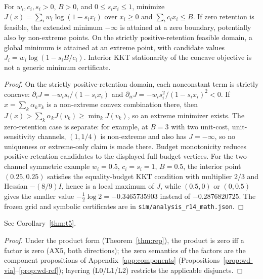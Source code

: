\begin{proposition}
\label{prop:linear-fraction}
For $w_i,c_i,s_i>0$, $B>0$, and $0\le s_ix_i\le1$, minimize
$J(x)=\sum_iw_i\log(1-s_ix_i)$ over $x_i\ge0$ and $\sum_i c_ix_i\le B$.
If zero retention is feasible, the extended minimum $-\infty$ is attained at
a zero boundary, potentially also by non-extreme points. On the strictly
positive-retention feasible domain, a global minimum is attained at an extreme
point, with candidate values $J_i=w_i\log(1-s_iB/c_i)$. Interior KKT
stationarity of the concave objective is not a generic minimum certificate.
\end{proposition}
\begin{proof}
On the strictly positive-retention domain, each nonconstant term is strictly
concave: $\partial_iJ=-w_is_i/(1-s_ix_i)$ and
$\partial_{ii}J=-w_is_i^2/(1-s_ix_i)^2<0$. If $x=\sum_k\alpha_kv_k$ is a
non-extreme convex combination there, then
$J(x)>\sum_k\alpha_kJ(v_k)\ge\min_kJ(v_k)$, so an extreme minimizer exists.
The zero-retention case is separate: for example, at $B=3$ with two unit-cost,
unit-sensitivity channels, $(1,1/4)$ is non-extreme and also has $J=-\infty$,
so no uniqueness or extreme-only claim is made there. Budget monotonicity
reduces positive-retention candidates to the displayed full-budget vertices. For the two-channel symmetric example $w_i=0.5$,
$c_i=s_i=1$, $B=0.5$, the interior point $(0.25,0.25)$ satisfies the
equality-budget KKT condition with multiplier $2/3$ and Hessian $-(8/9)I$,
hence is a local maximum of $J$, while $(0.5,0)$ or $(0,0.5)$ gives the
smaller value $-\tfrac12\log2=-0.3465735903$ instead of $-0.2876820725$.
The frozen grid and symbolic certificates are in
\texttt{sim/analysis\_r14\_math.json}.
\end{proof}

\begin{corollary}[restated: T5]
See Corollary~\ref{thm:t5}.
\end{corollary}
\begin{proof}
Under the product form (Theorem~\ref{thm:rep}), the product is zero iff a
factor is zero (AX5, both directions); the zero semantics of the factors are
the component propositions of Appendix~\ref{app:components}
(Propositions~\ref{prop:wd-via}--\ref{prop:wd-ref}); layering (L0/L1/L2)
restricts the applicable disjuncts.
\end{proof}

